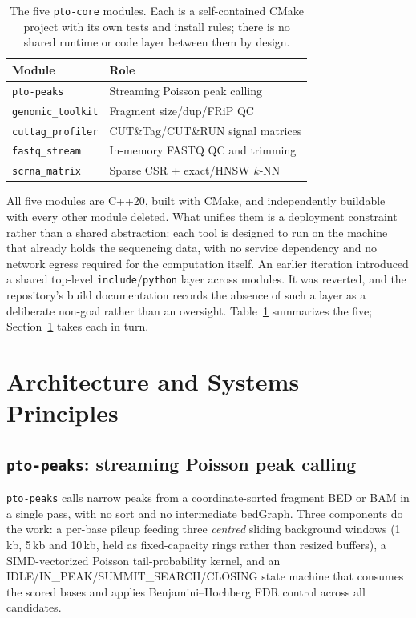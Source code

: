 \documentclass[10pt,twocolumn]{article}
\begin{document}
\begin{table}[t]
\centering
\caption{The five \texttt{pto-core} modules. Each is a self-contained CMake
project with its own tests and install rules; there is no shared runtime or
code layer between them by design.}
\label{tab:modules}
\small
\begin{tabular}{ll}
\toprule
Module & Role \\
\midrule
\texttt{pto-peaks} & Streaming Poisson peak calling \\
\texttt{genomic\_toolkit} & Fragment size/dup/FRiP QC \\
\texttt{cuttag\_profiler} & CUT\&Tag/CUT\&RUN signal matrices \\
\texttt{fastq\_stream} & In-memory FASTQ QC and trimming \\
\texttt{scrna\_matrix} & Sparse CSR + exact/HNSW $k$-NN \\
\bottomrule
\end{tabular}
\end{table}

All five modules are C++20, built with CMake, and independently buildable
with every other module deleted. What unifies them is a deployment
constraint rather than a shared abstraction: each tool is designed to run on
the machine that already holds the sequencing data, with no service
dependency and no network egress required for the computation itself. An
earlier iteration introduced a shared top-level \texttt{include}/\texttt{python}
layer across modules. It was reverted, and the repository's build
documentation records the absence of such a layer as a deliberate non-goal
rather than an oversight. Table~\ref{tab:modules} summarizes the five;
Section~\ref{sec:architecture} takes each in turn.

\section{Architecture and Systems Principles}
\label{sec:architecture}

\subsection{\texttt{pto-peaks}: streaming Poisson peak calling}
\label{sec:peaks}

\texttt{pto-peaks} calls narrow peaks from a coordinate-sorted fragment BED
or BAM in a single pass, with no sort and no intermediate bedGraph. Three
components do the work: a per-base pileup feeding three \emph{centred}
sliding background windows (1\,kb, 5\,kb and 10\,kb, held as fixed-capacity
rings rather than resized buffers), a SIMD-vectorized Poisson
tail-probability kernel, and an IDLE/IN\_PEAK/SUMMIT\_SEARCH/CLOSING state
machine that consumes the scored bases and applies Benjamini--Hochberg FDR
control across all candidates.
\end{document}
